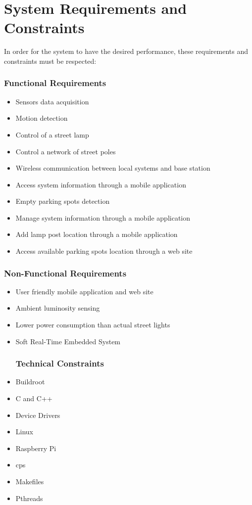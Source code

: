 \section{System Requirements and Constraints}
\label{subsection:requirements_constraints}
In order for the system to have the desired performance, these requirements and constraints must be respected:
\subsubsection{Functional Requirements}
\begin{itemize}
        \item Sensors data acquisition                          
        \item Motion detection
        \item Control of a street lamp
		\item Control a network of street poles
        \item Wireless communication between local systems and base station
		\item Access system information through a mobile application
        \item Empty parking spots detection
        \item Manage system information through a mobile application
        \item Add lamp post location through a mobile application
        \item Access available parking spots location through a web site
\end{itemize}
\subsubsection{Non-Functional Requirements}
\begin{itemize}
        \item User friendly mobile application and web site
        \item Ambient luminosity sensing
        \item Lower power consumption than actual street lights
        \item Soft Real-Time Embedded System
\subsubsection{Technical Constraints}
\end{itemize}
\begin{itemize}
        \item Buildroot
        \item C and C++ 
        \item Device Drivers
        \item Linux
        \item Raspberry Pi
        \item \ac{cps}
        \item Makefiles
        \item Pthreads
\end{itemize}
